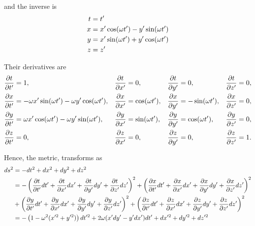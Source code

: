 \documentclass[a4paper,11pt]{article}
\begin{document}
and the inverse is
\begin{align}
    t &= t' \notag\\
    x &= x'\cos(\omega t') - y'\sin(\omega t') \notag\\
    y &= x'\sin(\omega t') + y'\cos(\omega t') \notag\\
    z &= z'
\end{align}

Their derivatives are
\begin{align}
    \frac{\partial t}{\partial t'} &= 1, &
    \frac{\partial t}{\partial x'} &= 0, &
    \frac{\partial t}{\partial y'} &= 0, &
    \frac{\partial t}{\partial z'} &= 0,\notag\\
    \frac{\partial x}{\partial t'} &= -\omega x'\sin(\omega t') - \omega y'\cos(\omega t'), &
    \frac{\partial x}{\partial x'} &= \cos(\omega t'), &
    \frac{\partial x}{\partial y'} &= -\sin(\omega t'), &
    \frac{\partial x}{\partial z'} &= 0,\notag\\
    \frac{\partial y}{\partial t'} &= \omega x'\cos(\omega t') - \omega y'\sin(\omega t'), &
    \frac{\partial y}{\partial x'} &= \sin(\omega t'), &
    \frac{\partial y}{\partial y'} &= \cos(\omega t'), &
    \frac{\partial y}{\partial z'} &= 0,\notag\\
    \frac{\partial z}{\partial t'} &= 0, &
    \frac{\partial z}{\partial x'} &= 0, &
    \frac{\partial z}{\partial y'} &= 0, &
    \frac{\partial z}{\partial z'} &= 1.
\end{align}


Hence, the metric, transforms as
\begin{align}
    ds^2 &= -dt^2 + dx^2 + dy^2 + dz^2 \notag\\
    &= -\left(\frac{\partial t}{\partial t'} dt' + \frac{\partial t}{\partial x'} dx' + \frac{\partial t}{\partial y'} dy' + \frac{\partial t}{\partial z'} dz'\right)^2 + \left(\frac{\partial x}{\partial t'} dt' + \frac{\partial x}{\partial x'} dx' + \frac{\partial x}{\partial y'} dy' + \frac{\partial x}{\partial z'} dz'\right)^2 \notag\\
    &+ \left(\frac{\partial y}{\partial t'} dt' + \frac{\partial y}{\partial x'} dx' + \frac{\partial y}{\partial y'} dy' + \frac{\partial y}{\partial z'} dz'\right)^2 + \left(\frac{\partial z}{\partial t'} dt' + \frac{\partial z}{\partial x'} dx' + \frac{\partial z}{\partial y'} dy' + \frac{\partial z}{\partial z'} dz'\right)^2\notag\\
    &= -\left(1 - \omega^2(x'^2 + y'^2)\right) dt'^2 + 2\omega(x'dy' - y'dx')dt' + dx'^2 + dy'^2 + dz'^2
\end{align}
\end{document}
